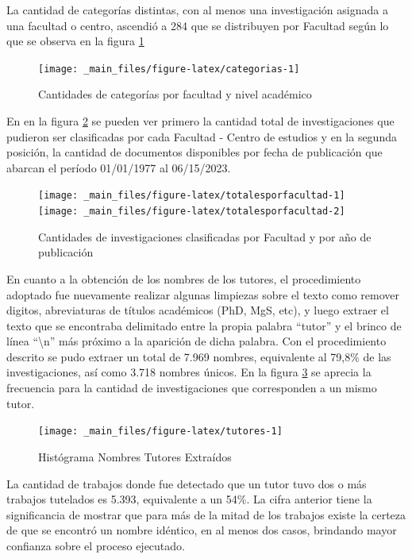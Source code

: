 \documentclass[
  12pt,
  openany]{book}
\begin{document}
La cantidad de categorías distintas, con al menos una investigación asignada a una facultad o centro, ascendió a 284 que se distribuyen por Facultad según lo que se observa en la figura \ref{fig:categorias}

\begin{figure}
\texttt{[image: \_main\_files/figure-latex/categorias-1]} \caption{Cantidades de categorías por facultad y nivel académico}\label{fig:categorias}
\end{figure}

En en la figura \ref{fig:totalesporfacultad} se pueden ver primero la cantidad total de investigaciones que pudieron ser clasificadas por cada Facultad - Centro de estudios y en la segunda posición, la cantidad de documentos disponibles por fecha de publicación que abarcan el período 01/01/1977 al 06/15/2023.

\begin{figure}
\texttt{[image: \_main\_files/figure-latex/totalesporfacultad-1]} \texttt{[image: \_main\_files/figure-latex/totalesporfacultad-2]} \caption{Cantidades de investigaciones clasificadas por Facultad y por año de publicación}\label{fig:totalesporfacultad}
\end{figure}

En cuanto a la obtención de los nombres de los tutores, el procedimiento adoptado fue nuevamente realizar algunas limpiezas sobre el texto como remover digitos, abreviaturas de títulos académicos (PhD, MgS, etc), y luego extraer el texto que se encontraba delimitado entre la propia palabra ``tutor'' y el brinco de línea ``\textbackslash n'' más próximo a la aparición de dicha palabra. Con el procedimiento descrito se pudo extraer un total de 7.969 nombres, equivalente al 79,8\% de las investigaciones, así como 3.718 nombres únicos. En la figura \ref{fig:tutores} se aprecia la frecuencia para la cantidad de investigaciones que corresponden a un mismo tutor.

\begin{figure}
\texttt{[image: \_main\_files/figure-latex/tutores-1]} \caption{Histógrama Nombres Tutores Extraídos }\label{fig:tutores}
\end{figure}

La cantidad de trabajos donde fue detectado que un tutor tuvo dos o más trabajos tutelados es 5.393, equivalente a un 54\%. La cifra anterior tiene la significancia de mostrar que para más de la mitad de los trabajos existe la certeza de que se encontró un nombre idéntico, en al menos dos casos, brindando mayor confianza sobre el proceso ejecutado.
\end{document}

